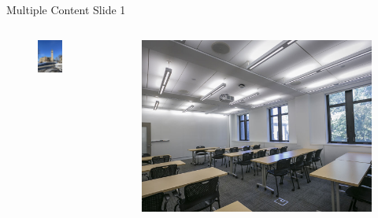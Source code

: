 \documentclass[usenames,dvipsnames]{beamer}
\begin{document}
\begin{frame}{Multiple Content Slide 1}
    \begin{columns}
        \begin{column}{0.35\textwidth}
            \begin{figure}
                \centering
                \includegraphics[width=\linewidth]{Images/McGraw_Tower_in_January.JPG}
            \end{figure} 
        \end{column} 
        \begin{column}{0.65\textwidth} \scriptsize 
            \begin{figure}
                \centering
                \includegraphics[width=.57\linewidth]{Images/carousel-04.jpg}

\end{figure}
\end{column}
\end{columns}
\end{frame}
\end{document}
